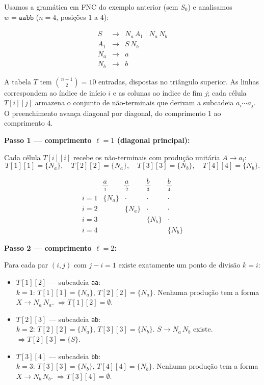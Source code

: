 Usamos a gramática em FNC do exemplo anterior (sem $S_0$) e analisamos $w = \texttt{aabb}$ ($n = 4$, posições $1$ a $4$):

\[
  \begin{array}{lcl}
    S   & \to & N_a\,A_1 \mid N_a\,N_b \\
    A_1 & \to & S\,N_b \\
    N_a & \to & a \\
    N_b & \to & b
  \end{array}
\]

A tabela $T$ tem $\binom{n+1}{2} = 10$ entradas, dispostas no triângulo superior.
As linhas correspondem ao índice de início $i$ e as colunas ao índice de fim $j$; cada célula $T[i][j]$ armazena o conjunto de não-terminais que derivam a subcadeia $a_i \cdots a_j$.
O preenchimento avança diagonal por diagonal, do comprimento 1 ao comprimento 4.

\bigskip
\noindent\textbf{Passo 1 — comprimento $\ell = 1$ (diagonal principal):}

Cada célula $T[i][i]$ recebe os não-terminais com produção unitária $A \to a_i$:
\[
T[1][1] = \{N_a\},\quad T[2][2] = \{N_a\},\quad T[3][3] = \{N_b\},\quad T[4][4] = \{N_b\}.
\]

\[
\begin{array}{c|cccc}
         & \underbrace{a}_{1} & \underbrace{a}_{2} & \underbrace{b}_{3} & \underbrace{b}_{4} \\[4pt]
\hline
i{=}1 & \{N_a\}  & \cdot     & \cdot     & \cdot \\[2pt]
i{=}2 &          & \{N_a\}   & \cdot     & \cdot \\[2pt]
i{=}3 &          &           & \{N_b\}   & \cdot \\[2pt]
i{=}4 &          &           &           & \{N_b\}
\end{array}
\]

\bigskip
\noindent\textbf{Passo 2 — comprimento $\ell = 2$:}

Para cada par $(i,j)$ com $j - i = 1$ existe exatamente um ponto de divisão $k = i$:

\begin{itemize}
  \item $T[1][2]$ — subcadeia \texttt{aa}:\\
        $k{=}1$: $T[1][1] = \{N_a\}$,\; $T[2][2] = \{N_a\}$.
        Nenhuma produção tem a forma $X \to N_a\,N_a$.
        $\Rightarrow T[1][2] = \emptyset$.

  \item $T[2][3]$ — subcadeia \texttt{ab}:\\
        $k{=}2$: $T[2][2] = \{N_a\}$,\; $T[3][3] = \{N_b\}$.
        $S \to N_a\,N_b$ existe.
        $\Rightarrow T[2][3] = \{S\}$.

  \item $T[3][4]$ — subcadeia \texttt{bb}:\\
        $k{=}3$: $T[3][3] = \{N_b\}$,\; $T[4][4] = \{N_b\}$.
        Nenhuma produção tem a forma $X \to N_b\,N_b$.
        $\Rightarrow T[3][4] = \emptyset$.
\end{itemize}

